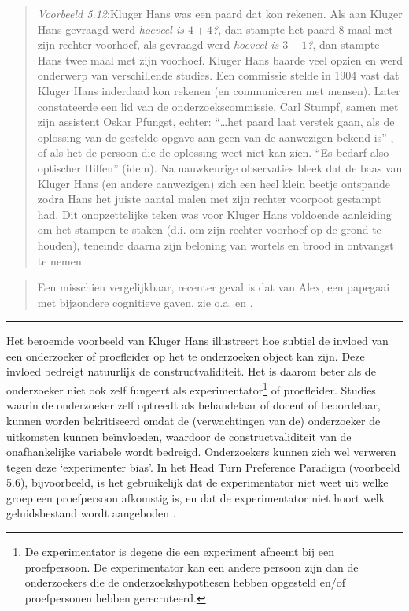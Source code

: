 \documentclass[
]{book}
\begin{document}
\begin{quote}
\emph{Voorbeeld 5.12}:Kluger Hans was een paard dat kon rekenen.
Als aan Kluger Hans gevraagd werd
\emph{hoeveel is \(4+4\)?}, dan stampte het paard 8 maal met zijn rechter
voorhoef, als gevraagd werd \emph{hoeveel is \(3-1\)?}, dan stampte Hans twee
maal met zijn voorhoef. Kluger Hans baarde veel opzien en werd onderwerp
van verschillende studies. Een commissie stelde in 1904 vast dat Kluger
Hans inderdaad kon rekenen (en communiceren met mensen). Later
constateerde een lid van de onderzoekscommissie, Carl Stumpf, samen met
zijn assistent Oskar Pfungst, echter: ``\ldots het paard laat verstek gaan,
als de oplossing van de gestelde opgave aan geen van de aanwezigen
bekend is'' \citep[ p.185, vert. HQ]{Pfung07}, of als het de persoon die de
oplossing weet niet kan zien. ``Es bedarf also optischer Hilfen'' (idem).
Na nauwkeurige observaties bleek dat de baas van Kluger Hans (en andere
aanwezigen) zich een heel klein beetje ontspande zodra Hans het juiste
aantal malen met zijn rechter voorpoot gestampt had. Dit onopzettelijke
teken was voor Kluger Hans voldoende aanleiding om het stampen te staken
(d.i. om zijn rechter voorhoef op de grond te houden), teneinde daarna
zijn beloning van wortels en brood in ontvangst te nemen
\citep{Pfung07} \citep[p.38--47]{Watz77}.
\end{quote}

\begin{quote}
Een misschien vergelijkbaar, recenter geval is dat van Alex, een
papegaai met bijzondere cognitieve gaven, zie o.a. \citep{BLLB14} en \citep{Alex15}.
\end{quote}

\begin{center}\rule{0.5\linewidth}{0.5pt}\end{center}

Het beroemde voorbeeld van Kluger Hans illustreert hoe subtiel de invloed van een
onderzoeker of proefleider op het te onderzoeken object kan zijn. Deze
invloed bedreigt natuurlijk de constructvaliditeit. Het is daarom beter
als de onderzoeker niet ook zelf fungeert als experimentator\footnote{De experimentator is degene die een experiment afneemt bij een proefpersoon. De experimentator kan een andere persoon zijn dan de onderzoekers die de onderzoekshypothesen hebben opgesteld en/of proefpersonen hebben gerecruteerd.} of
proefleider. Studies waarin de onderzoeker zelf optreedt als behandelaar
of docent of beoordelaar, kunnen worden bekritiseerd omdat de
(verwachtingen van de) onderzoeker de uitkomsten kunnen beïnvloeden,
waardoor de constructvaliditeit van de onafhankelijke variabele wordt
bedreigd. Onderzoekers kunnen zich wel verweren tegen deze `experimenter
bias'. In het Head Turn Preference Paradigm
(voorbeeld 5.6), bijvoorbeeld, is het gebruikelijk dat de
experimentator niet weet uit welke groep een proefpersoon afkomstig is,
en dat de experimentator niet hoort welk geluidsbestand wordt aangeboden
\citep[p.74]{John10}.
\end{document}
